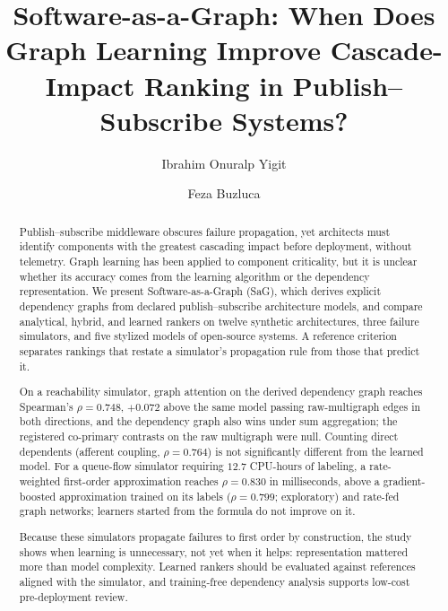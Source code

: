 \documentclass[preprint,3p]{elsarticle}
\begin{document}
\begin{frontmatter}

\title{Software-as-a-Graph: When Does Graph Learning Improve
  Cascade-Impact Ranking in Publish--Subscribe Systems?}

\author[itu,havelsan]{Ibrahim Onuralp Yigit}
\author[itu]{Feza Buzluca}


\begin{abstract}
Publish--subscribe middleware obscures failure propagation, yet architects must identify components with the greatest cascading impact before deployment, without telemetry. Graph learning has been applied to component criticality, but it is unclear whether its accuracy comes from the learning algorithm or the dependency representation. We present Software-as-a-Graph (SaG), which derives explicit dependency graphs from declared publish--subscribe architecture models, and compare analytical, hybrid, and learned rankers on twelve synthetic architectures, three failure simulators, and five stylized models of open-source systems. A reference criterion separates rankings that restate a simulator's propagation rule from those that predict it.

On a reachability simulator, graph attention on the derived dependency graph reaches Spearman's $\rho = 0.748$, $+0.072$ above the same model passing raw-multigraph edges in both directions, and the dependency graph also wins under sum aggregation; the registered co-primary contrasts on the raw multigraph were null. Counting direct dependents (afferent coupling, $\rho = 0.764$) is not significantly different from the learned model. For a queue-flow simulator requiring $12.7$ CPU-hours of labeling, a rate-weighted first-order approximation reaches $\rho = 0.830$ in milliseconds, above a gradient-boosted approximation trained on its labels ($\rho = 0.799$; exploratory) and rate-fed graph networks; learners started from the formula do not improve on it.

Because these simulators propagate failures to first order by construction, the study shows when learning is unnecessary, not yet when it helps: representation mattered more than model complexity. Learned rankers should be evaluated against references aligned with the simulator, and training-free dependency analysis supports low-cost pre-deployment review.


\end{abstract}
\end{frontmatter}
\end{document}
